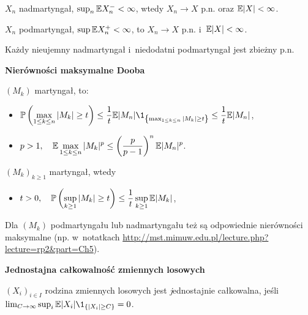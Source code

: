 
\usepackage{hyperref}



	\begin{theorem}
		$X_n$ nadmartyngał, $\sup_n \mathbb{E} X_n^- < \infty$, 
		wtedy $X_n \to X$ p.n. oraz $\mathbb{E} |X| < \infty$.
	\end{theorem}
	
	\begin{corollary}
		$X_n$ podmartyngał, $\sup \mathbb{E} X_n^+ < \infty$, to $X_n \to X$ p.n. 
		i~$\mathbb{E} |X| < \infty$.
	\end{corollary}
	
	\begin{corollary}
		Każdy nieujemny nadmartyngał i~niedodatni podmartyngał 
		jest zbieżny p.n.
	\end{corollary}
	
	{\bf Nierówności maksymalne Dooba}
	\begin{theorem}
		$(M_k)$ martyngał, to:
		\begin{itemize}
			\item $\displaystyle
			\P\left(\max_{1 \leq k \leq n} |M_k| \geq t\right)
			\leq
			\frac1t \E |M_n| 
				\1_{\left\{\max_{1 \leq k \leq n} |M_k| \geq t\right\}}
			\leq 
			\frac1t \E |M_n|$,
			
			\item $p>1, \quad \displaystyle
			\mathbb{E} \max_{1 \leq k \leq n} |M_k|^p 
			\leq 
			\left(\frac{p}{p-1}\right)^n \mathbb{E} |M_n|^p$.
		\end{itemize}
	\end{theorem}
	
	\begin{corollary}
		$(M_k)_{k \geq 1}$ martyngał, wtedy
		\begin{itemize}
			\item $t>0, \quad \displaystyle
			\mathbb{P}\left(\sup_{k \geq 1} |M_k| \geq t\right) 
			\leq
			\frac{1}{t} \sup_{k \geq 1} \mathbb{E} |M_k|$,
		\end{itemize}
	\end{corollary}
	
	\begin{remark}
		Dla $(M_k)$ podmartyngału lub nadmartyngału 
		też są odpowiednie nierówności maksymalne
		(np. w~notatkach \url{http://mst.mimuw.edu.pl/lecture.php?lecture=rp2&part=Ch5}).
	\end{remark}
	
	\pagebreak
	
	{\bf Jednostajna całkowalność zmiennych losowych}
	\begin{definition}
		$(X_i)_{i \in I}$ rodzina zmiennych losowych jest 
		{\emph jednostajnie całkowalna}, jeśli \\
		${\lim_{C \to \infty} \sup_i \E |X_i|
			\1_{\{|X_i| \geq C \}} = 0}$.
	\end{definition}
	
